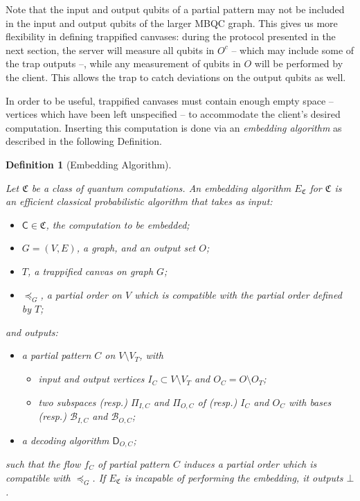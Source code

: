 \documentclass[12pt]{iopart}
\newcommand{\cptp}[1]{\mathsf{#1}} \newcommand{\pd}[1]{\mathcal{#1}}  \newcommand{\sch}[1]{\bm{#1}}
\renewcommand{\1}{\mathds{1}}
\newcommand{\Deco}{\cptp D_{O, C}}
\newtheorem{definition}{Definition}
\begin{document}
Note that the input and output qubits of a partial pattern may not be included in the input and output qubits of the larger MBQC graph. This gives us more flexibility in defining trappified canvases: during the protocol presented in the next section, the server will measure all qubits in $O^c$ -- which may include some of the trap outputs --, while any measurement of qubits in $O$ will be performed by the client. This allows the trap to catch deviations on the output qubits as well.



In order to be useful, trappified canvases must contain enough empty space -- vertices which have been left unspecified -- to accommodate the client's desired computation. Inserting this computation is done via an \emph{embedding algorithm} as described in the following Definition.

\begin{definition}[Embedding Algorithm]
\label{def:embed-alg}

Let $\mathfrak{C}$ be a class of quantum computations. An \emph{embedding algorithm} $E_{\mathfrak{C}}$ for $\mathfrak{C}$ is an efficient classical probabilistic algorithm that takes as input:

\begin{itemize}
\item $\cptp{C} \in \mathfrak{C}$, the computation to be embedded;
\item $G = (V, E)$, a graph, and an output set $O$;
\item $T$, a trappified canvas on graph $G$;
\item $\preceq_G$, a partial order on $V$ which is compatible with the partial order defined by $T$;
\end{itemize}

\noindent and outputs:
\begin{itemize}
\item a partial pattern $C$ on $V \setminus V_T$, with
  \begin{itemize}
  \item input and output vertices $I_C \subset V \setminus V_T$ and $O_C = O \setminus O_T$;
  \item two subspaces (resp.) $\Pi_{I,C}$ and $\Pi_{O,C}$ of (resp.) $I_C$ and $O_C$ with bases (resp.) $\mathcal{B}_{I,C}$ and $\mathcal{B}_{O,C}$;
  \end{itemize}
\item a decoding algorithm $\Deco$;
\end{itemize}
such that the flow $f_C$ of partial pattern $C$ induces a partial order which is compatible with $\preceq_G$. If $E_{\mathfrak C}$ is incapable of performing the embedding, it outputs $\bot$.

\end{definition}
\end{document}
